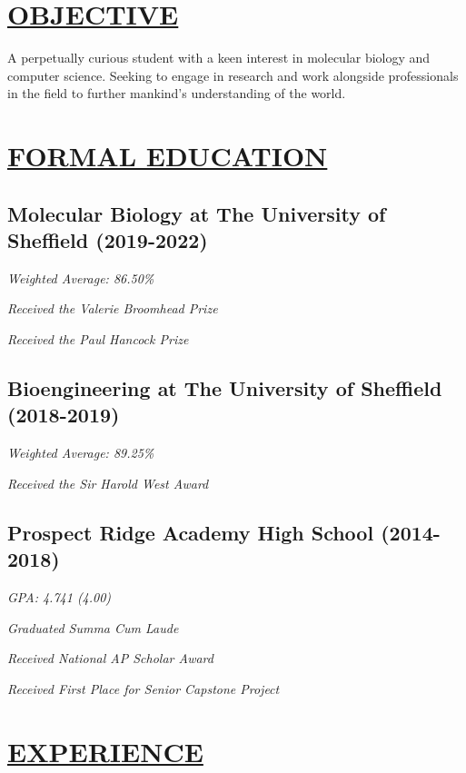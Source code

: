 \documentclass[twocolumn, a4paper, fontsize=9pt, headsepline, footsepline]{scrartcl}
\begin{document}
\setul{}{2pt}
\section*{\ul{OBJECTIVE}}
\noindent
A perpetually curious student with a keen interest in molecular biology and
computer science. Seeking to engage in research and work alongside professionals
in the field to further mankind's understanding of the world.

\section*{\ul{FORMAL EDUCATION}}
\subsection*{Molecular Biology at The University of Sheffield (2019-2022)}
\onehalfspacing
\emph{Weighted Average: 86.50\%}\par
\emph{Received the Valerie Broomhead Prize}\par
\emph{Received the Paul Hancock Prize}\par

\subsection*{Bioengineering at The University of Sheffield (2018-2019)}
\onehalfspacing
\emph{Weighted Average: 89.25\%}\par
\emph{Received the Sir Harold West Award}

\subsection*{Prospect Ridge Academy High School (2014-2018)}
\onehalfspacing
\emph{GPA: 4.741 (4.00)}\par
\emph{Graduated Summa Cum Laude}\par
\emph{Received National AP Scholar Award}\par
\emph{Received First Place for Senior Capstone Project}

\section*{\ul{EXPERIENCE}}
\end{document}
